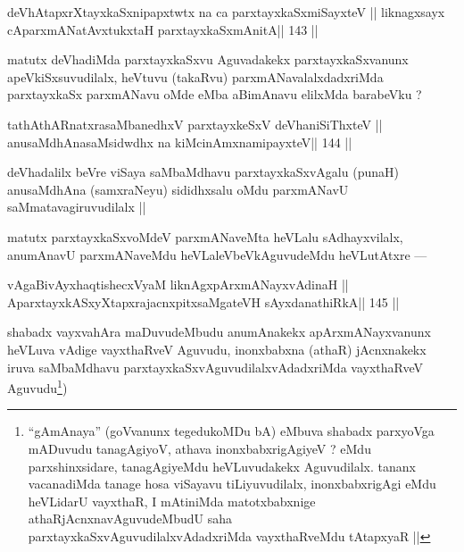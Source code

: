 \begin{shl}
\footnotemark[3]deVhAtapxrXtayxkaSxnipapxtwtx na ca parxtayxkaSxmiSayxteV ||
liknagxsayx cAparxmANatAvxtukxtaH  parxtayxkaSxmAnitA\hfill || 143 ||
\end{shl}

\begin{artha}
matutx deVhadiMda parxtayxkaSxvu Aguvadakekx parxtayxkaSxvanunx apeVkiSxsuvudilalx, heVtuvu (takaRvu) parxmANavalalxdadxriMda parxtayxkaSx parxmANavu oMde eMba aBimAnavu elilxMda barabeVku ?
\end{artha}

\begin{shl}
\footnotemark[4]tathA\s thARnatxrasaMbanedhxV parxtayxkeSxV deVhaniSiThxteV ||
anusaMdhAnasaMsidwdhx na kiMcinAmxnamipayxteV\hfill || 144 ||
\end{shl}

\begin{artha}
deVhadalilx beVre viSaya saMbaMdhavu parxtayxkaSxvAgalu (punaH) anusaMdhAna (samxraNeyu) sididhxsalu oMdu parxmANavU saMmatavagiruvudilalx || 

matutx parxtayxkaSxvoMdeV parxmANaveMta heVLalu sAdhayxvilalx, anumAnavU parxmANaveMdu heVLaleVbeVkAguvudeMdu heVLutAtxre ---
\end{artha}

\begin{shl}
vAgaBivAyxhaqtishecxVyaM liknAgxpArxmANayxvAdinaH ||
AparxtayxkASxyXtapxrajacnxpitxsaMgateVH sAyxdanathiRkA\hfill || 145 ||
\end{shl}

\begin{artha}
shabadx vayxvahAra maDuvudeMbudu anumAnakekx apArxmANayxvanunx heVLuva vAdige vayxthaRveV Aguvudu, inonxbabxna (athaR) jAcnxnakekx iruva saMbaMdhavu parxtayxkaSxvAguvudilalxvAdadxriMda vayxthaRveV Aguvudu\footnote[5]{``gAmAnaya'' (goVvanunx tegedukoMDu bA) eMbuva shabadx parxyoVga mADuvudu tanagAgiyoV, athava inonxbabxrigAgiyeV ? eMdu parxshinxsidare, tanagAgiyeMdu heVLuvudakekx Aguvudilalx. tananx vacanadiMda tanage hosa viSayavu tiLiyuvudilalx, inonxbabxrigAgi eMdu heVLidarU vayxthaR, I mAtiniMda matotxbabxnige athaRjAcnxnavAguvudeMbudU saha parxtayxkaSxvAguvudilalxvAdadxriMda vayxthaRveMdu tAtapxyaR ||})
\end{artha}

